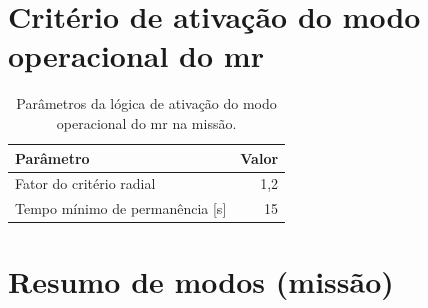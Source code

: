 

\section{Critério de ativação do modo operacional do \gls{mr}}
\label{apC_ativacao_modo_op}

\begin{table}[H]
\centering
\caption{Parâmetros da lógica de ativação do modo operacional do \gls{mr} na missão.}
\label{ttab_apC_modo_op}
\begin{tabular}{lr}
\toprule
\textbf{Parâmetro} & \textbf{Valor} \\
\midrule
Fator do critério radial & 1,2 \\
Tempo mínimo de permanência [s] & 15 \\
\bottomrule
\end{tabular}
\end{table}

\section{Resumo de modos (missão)}
\label{apD_resumo_modos}

